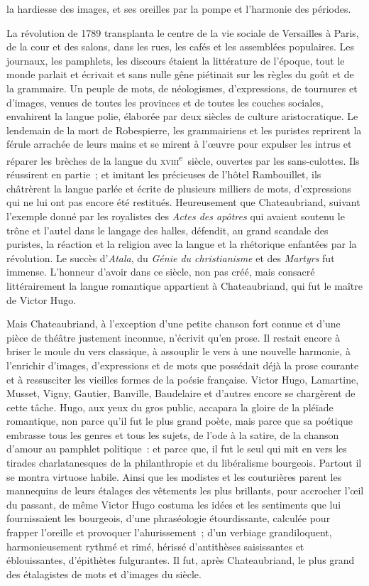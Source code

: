 \documentclass[french,twoside]{book} %
\begin{document}
\label{p54}la hardiesse des images, et ses oreilles par la pompe et l’harmonie des périodes.\par
La révolution de 1789 transplanta le centre de la vie sociale de Versailles à Paris, de la cour et des salons, dans les rues, les cafés et les assemblées populaires. Les journaux, les pamphlets, les discours étaient la littérature de l’époque, tout le monde parlait et écrivait et sans nulle gêne piétinait sur les règles du goût et de la grammaire. Un peuple de mots, de néologismes, d’expressions, de tournures et d’images, venues de toutes les provinces et de toutes les couches sociales, envahirent la langue polie, élaborée par deux siècles de culture aristocratique. Le lendemain de la mort de Robespierre, les grammairiens et les puristes reprirent la férule arrachée de leurs mains et se mirent à l’œuvre pour expulser les intrus et réparer les brèches de la langue du \textsc{xviii}\textsuperscript{e} siècle, ouvertes par les sans-culottes. Ils réussirent en partie ; et imitant les précieuses de l’hôtel Rambouillet, ils châtrèrent la langue parlée et écrite de plusieurs milliers de mots, d’expressions qui ne lui ont pas encore été restitués. Heureusement que Chateaubriand, suivant l’exemple donné par les royalistes des \emph{Actes des apôtres} qui avaient soutenu le trône et l’autel dans le langage des halles, défendit, au grand scandale des puristes, la réaction et la religion avec la langue et la rhétorique enfantées par la révolution. Le succès d’\emph{Atala}, du \emph{Génie du christianisme} et des \emph{Martyrs} fut immense. L’honneur d’avoir dans ce siècle, non pas créé, mais consacré littérairement la langue romantique appartient à Chateaubriand, qui fut le maître de Victor Hugo.\par
\label{p55}Mais Chateaubriand, à l’exception d’une petite chanson fort connue et d’une pièce de théâtre justement inconnue, n’écrivit qu’en prose. Il restait encore à briser le moule du vers classique, à assouplir le vers à une nouvelle harmonie, à l’enrichir d’images, d’expressions et de mots que possédait déjà la prose courante et à ressusciter les vieilles formes de la poésie française. Victor Hugo, Lamartine, Musset, Vigny, Gautier, Banville, Baudelaire et d’autres encore se chargèrent de cette tâche. Hugo, aux yeux du gros public, accapara la gloire de la pléïade romantique, non parce qu’il fut le plus grand poète, mais parce que sa poétique embrasse tous les genres et tous les sujets, de l’ode à la satire, de la chanson d’amour au pamphlet politique : et parce que, il fut le seul qui mit en vers les tirades charlatanesques de la philanthropie et du libéralisme bourgeois. Partout il se montra virtuose habile. Ainsi que les modistes et les couturières parent les mannequins de leurs étalages des vêtements les plus brillants, pour accrocher l’œil du passant, de même Victor Hugo costuma les idées et les sentiments que lui fournissaient les bourgeois, d’une phraséologie étourdissante, calculée pour frapper l’oreille et provoquer l’ahurissement ; d’un verbiage grandiloquent, harmonieusement rythmé et rimé, hérissé d’antithèses saisissantes et éblouissantes, d’épithètes fulgurantes. Il fut, après Chateaubriand, le plus grand des étalagistes de mots et d’images du siècle.\par
\end{document}
